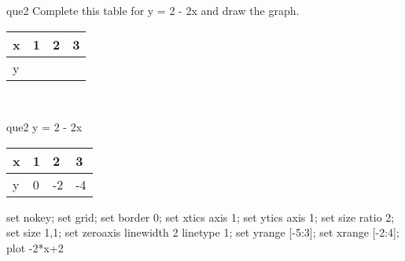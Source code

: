 \documentclass[13.5pt, varwidth=true]{beamer}
\begin{document}
\begin{frame}[shrink=19,fragile]
	\begin{beamercolorbox}[rounded=true, left, shadow=true,wd=14.8cm]{que2}
		 Complete this table for y = 2 - 2x and draw the graph. \\[0.3cm] \renewcommand{\arraystretch}{1.2}\begin{tabular}{|C|C|C|C|} \hline x & 1 & 2 & 3 \\ \hline y & & & \\ \hline \end{tabular}\\[0.3cm]
	\end{beamercolorbox}
\end{frame}
\begin{frame}[shrink=19,fragile]
	\begin{beamercolorbox}[rounded=true, left, shadow=true,wd=14.8cm]{que2}
 		y = 2 - 2x\renewcommand{\arraystretch}{1.2}\begin{tabular}{|C|C|C|C|} \hline x & 1 & 2 & 3 \\ \hline y & 0 & -2 & -4\\ \hline \end{tabular}\begin{gnuplot}[terminal=pdf] set nokey; set grid; set border 0; set xtics axis 1; set ytics axis 1; set size ratio 2; set size 1,1; set zeroaxis linewidth 2 linetype 1; set yrange [-5:3]; set xrange [-2:4]; plot -2*x+2 \end{gnuplot}
	\end{beamercolorbox}
\end{frame}
\end{document}
